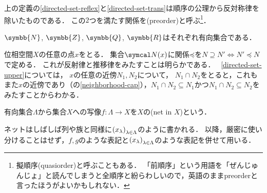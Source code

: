 \documentclass{ltjsbook}
\begin{document}
上の定義の\ref{directed-set-reflex}と\ref{directed-set-trans}は順序の公理から反対称律を除いたものである．
この\(2\)つを満たす関係を(preorder)と呼ぶ\footnote{%
擬順序(quasiorder)と呼ぶこともある．
「前順序」という用語を「ぜんじゅんじょ」と読んでしまうと全順序と紛らわしいので，英語のままpreorderと言ったほうがよいかもしれない．}．

\begin{exa} \(\symbb{N}\), \(\symbb{Z}\), \(\symbb{Q}\), \(\symbb{R}\)はそれぞれ有向集合である．
\end{exa}

\begin{exa} 位相空間\(X\)の任意の点\(x\)をとる．
集合\(\Neighborhood{x}\)に関係\(\mathord{\preceq}\)を\(N \supseteq N' \Leftrightarrow N' \preceq N\)で定める．
これが反射律と推移律をみたすことは明らかである．
~\ref{directed-set-upper}については，
\(x\)の任意の近傍\(N_1, N_2\)について，
\(N_1 \cap N_2\)をとると，これもまた\(x\)の近傍であり（の\ref{neighborhood-cap}），\(N_1 \cap N_2 \subseteq N_1\)かつ\(N_1 \cap N_2 \subseteq N_2\)をみたすことからわかる．
\end{exa}

\begin{thmbox}
\begin{definition}
有向集合\(\Lambda\)から集合\(X\)への写像\(f \colon \Lambda \to X\)を\(X\)の(net in \(X\))という．
\end{definition}
\end{thmbox}

ネットはしばしば列や族と同様に\({({x}_\lambda)}_{\lambda \in \Lambda}\)のように書かれる．
以降，厳密に使い分けることはせず，\(f, g\)のような表記と\({({x}_\lambda)}_{\lambda \in \Lambda}\)のような表記を併せて用いる．
\end{document}
